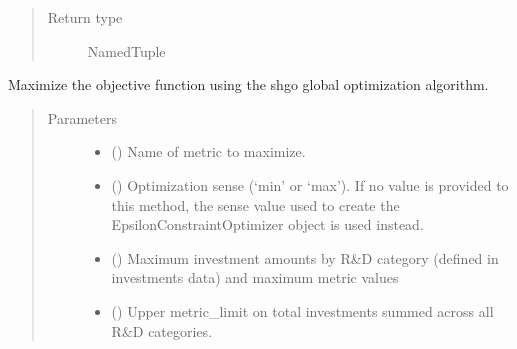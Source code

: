 \documentclass[letterpaper,10pt,english]{sphinxmanual}
\begin{document}
\begin{fulllineitems}
\begin{fulllineitems}
\begin{quote}
\begin{description}
\item[{Return type}] \leavevmode
NamedTuple

\end{description}\end{quote}

\end{fulllineitems}


\begin{fulllineitems}
\label{\detokenize{tyche:tyche.EpsilonConstraints.EpsilonConstraintOptimizer.opt_shgo}}
Maximize the objective function using the shgo global optimization
algorithm.
\begin{quote}\begin{description}
\item[{Parameters}] \leavevmode\begin{itemize}
\item {} 
 () \textendash{} Name of metric to maximize.

\item {} 
 () \textendash{} Optimization sense (‘min’ or ‘max’). If no value is provided to
this method, the sense value used to create the
EpsilonConstraintOptimizer object is used instead.

\item {} 
 () \textendash{} Maximum investment amounts by R\&D category (defined in investments data)
and maximum metric values

\item {} 
 () \textendash{} Upper metric\_limit on total investments summed across all R\&D categories.


\end{itemize}
\end{description}
\end{quote}
\end{fulllineitems}
\end{fulllineitems}
\end{document}
